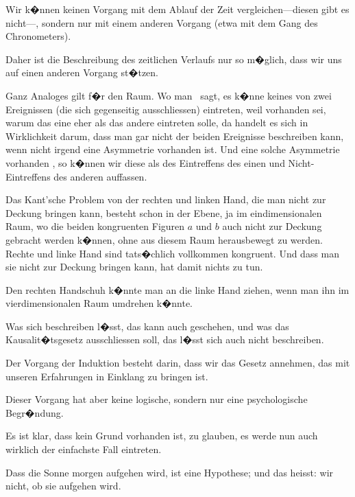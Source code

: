 \begin{propositions}
{Wir k�nnen keinen Vorgang mit dem \glqq{}Ablauf
der Zeit\grqq{} ver\-glei\-chen---diesen gibt es nicht---,
sondern nur mit einem anderen Vorgang (etwa
mit dem Gang des Chronometers).

Daher ist die Beschreibung des zeitlichen
Verlaufs nur so m�glich, dass wir uns auf einen
anderen Vorgang st�tzen.

Ganz Analoges gilt f�r den Raum. Wo man
\zumBeispiel\ sagt, es k�nne keines von zwei Ereignissen
(die sich gegenseitig aus\-schlies\-sen) eintreten, weil
 vorhanden sei, warum das eine
eher als das andere eintreten solle, da handelt es
sich in Wirklichkeit darum, dass man gar nicht
 der beiden Ereignisse beschreiben kann,
wenn nicht irgend eine Asymmetrie vorhanden ist.
Und  eine solche Asymmetrie vorhanden ,
so k�nnen wir diese als  des Eintreffens
des einen und Nicht-Eintreffens des anderen
auffassen.}


{Das Kant'sche Problem von der rechten und
linken Hand, die man nicht zur Deckung bringen
kann, besteht schon in der Ebene, ja im eindimensionalen
Raum, wo die beiden kongruenten
Figuren $a$ und $b$ auch nicht zur Deckung gebracht
werden k�nnen, ohne aus diesem Raum
herausbewegt zu werden. Rechte und linke Hand
sind tats�chlich vollkommen kongruent. Und
dass man sie nicht zur Deckung bringen kann,
hat damit nichts zu tun.


Den rechten Handschuh k�nnte man an die
linke Hand ziehen, wenn man ihn im vierdimensionalen
Raum umdrehen k�nnte.}


{Was sich beschreiben l�sst, das kann auch
geschehen, und was das Kausalit�tsgesetz ausschliessen
soll, das l�sst sich auch nicht beschreiben.}


{Der Vorgang der Induktion besteht darin, dass
wir das  Gesetz annehmen, das mit
unseren Erfahrungen in Einklang zu bringen ist.}


{Dieser Vorgang hat aber keine logische, sondern
nur eine psychologische Begr�ndung.

Es ist klar, dass kein Grund vorhanden ist, zu
glauben, es werde nun auch wirklich der einfachste
Fall eintreten.}


{Dass die Sonne morgen aufgehen wird, ist eine
Hypothese; und das heisst: wir  nicht, ob
sie aufgehen wird.}



\end{propositions}
